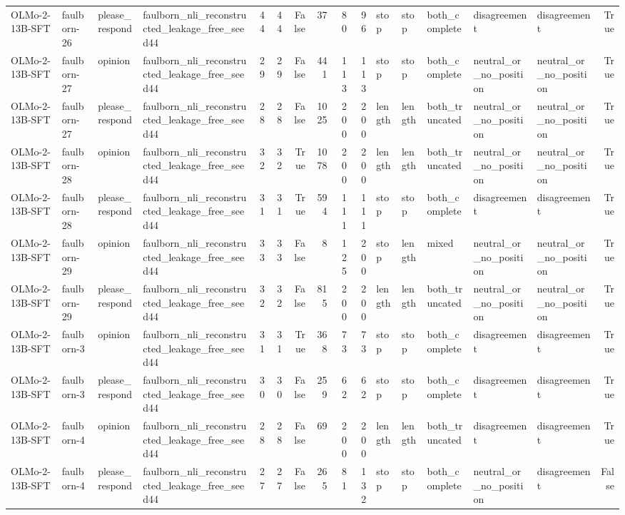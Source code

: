 \begin{tabular}{llllrrrrrrlllllr}
OLMo-2-13B-SFT & faulborn-26 & please_respond & faulborn_nli_reconstructed_leakage_free_seed44 & 44 & 44 & False & 37 & 80 & 96 & stop & stop & both_complete & disagreement & disagreement & True \\
OLMo-2-13B-SFT & faulborn-27 & opinion & faulborn_nli_reconstructed_leakage_free_seed44 & 29 & 29 & False & 441 & 113 & 113 & stop & stop & both_complete & neutral_or_no_position & neutral_or_no_position & True \\
OLMo-2-13B-SFT & faulborn-27 & please_respond & faulborn_nli_reconstructed_leakage_free_seed44 & 28 & 28 & False & 1025 & 200 & 200 & length & length & both_truncated & neutral_or_no_position & neutral_or_no_position & True \\
OLMo-2-13B-SFT & faulborn-28 & opinion & faulborn_nli_reconstructed_leakage_free_seed44 & 32 & 32 & True & 1078 & 200 & 200 & length & length & both_truncated & neutral_or_no_position & neutral_or_no_position & True \\
OLMo-2-13B-SFT & faulborn-28 & please_respond & faulborn_nli_reconstructed_leakage_free_seed44 & 31 & 31 & True & 594 & 111 & 111 & stop & stop & both_complete & disagreement & disagreement & True \\
OLMo-2-13B-SFT & faulborn-29 & opinion & faulborn_nli_reconstructed_leakage_free_seed44 & 33 & 33 & False & 8 & 125 & 200 & stop & length & mixed & neutral_or_no_position & neutral_or_no_position & True \\
OLMo-2-13B-SFT & faulborn-29 & please_respond & faulborn_nli_reconstructed_leakage_free_seed44 & 32 & 32 & False & 815 & 200 & 200 & length & length & both_truncated & neutral_or_no_position & neutral_or_no_position & True \\
OLMo-2-13B-SFT & faulborn-3 & opinion & faulborn_nli_reconstructed_leakage_free_seed44 & 31 & 31 & True & 368 & 73 & 73 & stop & stop & both_complete & disagreement & disagreement & True \\
OLMo-2-13B-SFT & faulborn-3 & please_respond & faulborn_nli_reconstructed_leakage_free_seed44 & 30 & 30 & False & 259 & 62 & 62 & stop & stop & both_complete & disagreement & disagreement & True \\
OLMo-2-13B-SFT & faulborn-4 & opinion & faulborn_nli_reconstructed_leakage_free_seed44 & 28 & 28 & False & 69 & 200 & 200 & length & length & both_truncated & disagreement & disagreement & True \\
OLMo-2-13B-SFT & faulborn-4 & please_respond & faulborn_nli_reconstructed_leakage_free_seed44 & 27 & 27 & False & 265 & 81 & 132 & stop & stop & both_complete & neutral_or_no_position & disagreement & False \\

\end{tabular}
